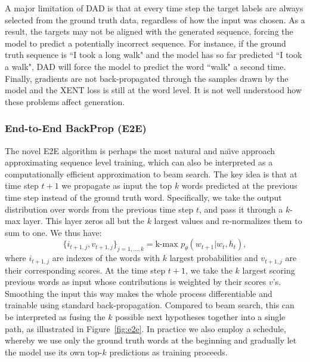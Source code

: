 \documentclass{article} \usepackage{iclr2016_conference,times}
\begin{document}
A major limitation of DAD is that at every time step the target labels are always selected from the ground truth data,  regardless of how the input was chosen. As a result, the targets may not be aligned with the generated sequence, forcing the model to predict a potentially incorrect sequence. 
For instance, if the ground truth sequence is ``I took a long
walk" and the model has so far predicted ``I took a walk", DAD will force the model to predict the word ``walk" a second time. 
Finally, gradients are not back-propagated through the samples drawn by the model and the XENT loss is still at the word level. 
It is not well understood how these problems affect generation.

\subsubsection{End-to-End BackProp (E2E)} 
\label{model-e2e}
The novel E2E algorithm is perhaps the most natural and na\"{\i}ve approach approximating sequence level training, which can also be interpreted as a computationally efficient approximation to beam search. 
The key idea is that at time step $t + 1$ we propagate as input the top $k$ words predicted at the previous time step instead of the ground truth word. 
Specifically, we take the output distribution over words from the previous time step $t$, and pass it through a $k$-max layer. 
This layer zeros all but the $k$ largest values and re-normalizes 
them to sum to one. We thus have: 
\begin{equation}
\{i_{t+1,j}, v_{t+1,j}\}_{j=1, \dots, k} = \mbox{k-max } p_\theta(w_{t+1} |  w_t, h_t), \label{eq:e2e}
\end{equation}
where $i_{t+1,j}$ are indexes of the words with $k$ largest probabilities and $v_{t+1,j}$ are their corresponding scores. 
At the time step $t+1$, we take the $k$ largest scoring previous words as input whose 
contributions is weighted by their scores $v$'s. 
Smoothing the input this way makes the whole process 
differentiable and trainable using standard back-propagation.
Compared to beam search, this can be interpreted as fusing the $k$ possible next 
hypotheses together into a single path, as illustrated in Figure~\ref{fig:e2e}. 
In practice we also employ a schedule, whereby we use only the ground truth words 
at the beginning and gradually let the model use its own top-$k$ predictions as training proceeds. 
\end{document}
